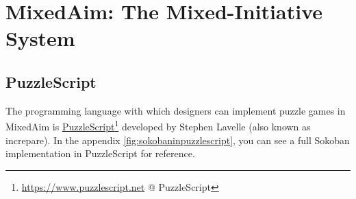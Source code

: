 \chapter{MixedAim: The Mixed-Initiative System}

\section{PuzzleScript}

The programming language with which designers can implement puzzle games in MixedAim is \href{https://www.puzzlescript.net}{PuzzleScript}\footnote{\url{https://www.puzzlescript.net} @ PuzzleScript} developed by Stephen Lavelle (also known as increpare).
In the appendix \ref{fig:sokobaninpuzzlescript}, you can see a full Sokoban implementation in PuzzleScript for reference.

